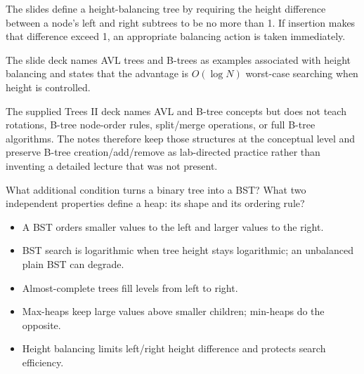 The slides define a height-balancing tree by requiring the height difference between a node's left and right subtrees to be no more than 1. If insertion makes that difference exceed 1, an appropriate balancing action is taken immediately.

\begin{mlfigure}
\end{mlfigure}

The slide deck names AVL trees and B-trees as examples associated with height balancing and states that the advantage is $O(\log N)$ worst-case searching when height is controlled.

\begin{clarification}
The supplied Trees II deck names AVL and B-tree concepts but does not teach rotations, B-tree node-order rules, split/merge operations, or full B-tree algorithms. The notes therefore keep those structures at the conceptual level and preserve B-tree creation/add/remove as lab-directed practice rather than inventing a detailed lecture that was not present.
\end{clarification}

\begin{quickcheck}
What additional condition turns a binary tree into a BST? What two independent properties define a heap: its shape and its ordering rule?
\end{quickcheck}

\begin{chapterrecap}
\begin{itemize}
  \item A BST orders smaller values to the left and larger values to the right.
  \item BST search is logarithmic when tree height stays logarithmic; an unbalanced plain BST can degrade.
  \item Almost-complete trees fill levels from left to right.
  \item Max-heaps keep large values above smaller children; min-heaps do the opposite.
  \item Height balancing limits left/right height difference and protects search efficiency.
\end{itemize}
\end{chapterrecap}


